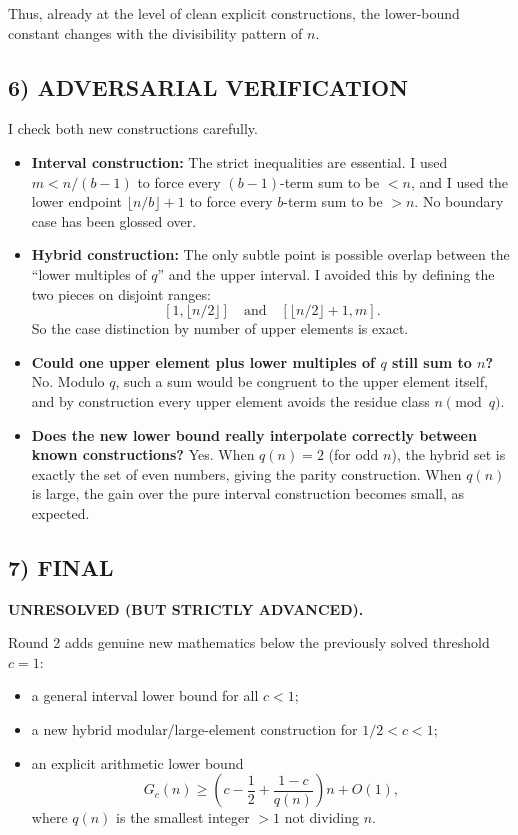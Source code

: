Thus, already at the level of clean explicit constructions, the lower-bound constant changes with the divisibility pattern of $n$.

\subsection*{6) ADVERSARIAL VERIFICATION}
I check both new constructions carefully.

\begin{itemize}
\item \textbf{Interval construction:}  
The strict inequalities are essential.  I used $m<n/(b-1)$ to force every $(b-1)$-term sum to be $<n$, and I used the lower endpoint $\lfloor n/b\rfloor+1$ to force every $b$-term sum to be $>n$.  No boundary case has been glossed over.

\item \textbf{Hybrid construction:}  
The only subtle point is possible overlap between the ``lower multiples of $q$'' and the upper interval.  I avoided this by defining the two pieces on disjoint ranges:
\[
[1,\lfloor n/2\rfloor]
\quad\text{and}\quad
[\lfloor n/2\rfloor+1,m].
\]
So the case distinction by number of upper elements is exact.

\item \textbf{Could one upper element plus lower multiples of $q$ still sum to $n$?}  
No.  Modulo $q$, such a sum would be congruent to the upper element itself, and by construction every upper element avoids the residue class $n \pmod q$.

\item \textbf{Does the new lower bound really interpolate correctly between known constructions?}  
Yes.  When $q(n)=2$ (for odd $n$), the hybrid set is exactly the set of even numbers, giving the parity construction.  When $q(n)$ is large, the gain over the pure interval construction becomes small, as expected.
\end{itemize}

\subsection*{7) FINAL}
\textbf{UNRESOLVED (BUT STRICTLY ADVANCED).}

Round 2 adds genuine new mathematics below the previously solved threshold $c=1$:

\begin{itemize}
\item a general interval lower bound for all $c<1$;
\item a new hybrid modular/large-element construction for $1/2<c<1$;
\item an explicit arithmetic lower bound
\[
G_c(n)\ge \left(c-\frac12+\frac{1-c}{q(n)}\right)n+O(1),
\]
where $q(n)$ is the smallest integer $>1$ not dividing $n$.
\end{itemize}

